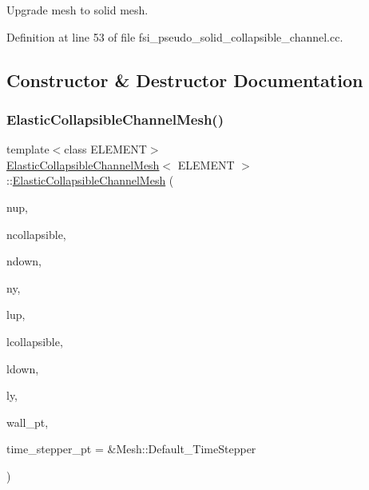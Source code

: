 Upgrade mesh to solid mesh. 

Definition at line 53 of file fsi\+\_\+pseudo\+\_\+solid\+\_\+collapsible\+\_\+channel.\+cc.



\subsection{Constructor \& Destructor Documentation}
\mbox{\label{classElasticCollapsibleChannelMesh_aa8a158f7f3d3e40dc29bdaa756546771}} 
\subsubsection{\texorpdfstring{Elastic\+Collapsible\+Channel\+Mesh()}{ElasticCollapsibleChannelMesh()}}
{\footnotesize\ttfamily template$<$class E\+L\+E\+M\+E\+NT$>$ \\
\hyperlink{classElasticCollapsibleChannelMesh}{Elastic\+Collapsible\+Channel\+Mesh}$<$ E\+L\+E\+M\+E\+NT $>$\+::\hyperlink{classElasticCollapsibleChannelMesh}{Elastic\+Collapsible\+Channel\+Mesh} (\begin{DoxyParamCaption}\item[{const unsigned \&}]{nup,  }\item[{const unsigned \&}]{ncollapsible,  }\item[{const unsigned \&}]{ndown,  }\item[{const unsigned \&}]{ny,  }\item[{const double \&}]{lup,  }\item[{const double \&}]{lcollapsible,  }\item[{const double \&}]{ldown,  }\item[{const double \&}]{ly,  }\item[{Geom\+Object $\ast$}]{wall\+\_\+pt,  }\item[{Time\+Stepper $\ast$}]{time\+\_\+stepper\+\_\+pt = {\ttfamily \&Mesh\+:\+:Default\+\_\+TimeStepper} }\end{DoxyParamCaption})\hspace{0.3cm}{\ttfamily [inline]}}




